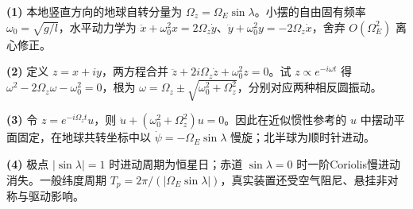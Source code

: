 \par\noindent\textbf{(1)} 本地竖直方向的地球自转分量为 \(\Omega_z=\Omega_E\sin\lambda\)。小摆的自由固有频率 \(\omega_0=\sqrt{g/l}\)，水平动力学为 \(\ddot x+\omega_0^2x=2\Omega_z\dot y\)、\(\ddot y+\omega_0^2y=-2\Omega_z\dot x\)，舍弃 \(O(\Omega_E^2)\) 离心修正。
\par\noindent\textbf{(2)} 定义 \(z=x+iy\)，两方程合并 \(\ddot z+2i\Omega_z\dot z+\omega_0^2z=0\)。试 \(z\propto e^{-i\omega t}\) 得 \(\omega^2-2\Omega_z\omega-\omega_0^2=0\)，根为 \(\omega=\Omega_z\pm\sqrt{\omega_0^2+\Omega_z^2}\)，分别对应两种相反圆振动。
\par\noindent\textbf{(3)} 令 \(z=e^{-i\Omega_z t}u\)，则 \(\ddot u+(\omega_0^2+\Omega_z^2)u=0\)。因此在近似惯性参考的 \(u\) 中摆动平面固定，在地球共转坐标中以 \(\dot\psi=-\Omega_E\sin\lambda\) 慢旋；北半球为顺时针进动。
\par\noindent\textbf{(4)} 极点 \(|\sin\lambda|=1\) 时进动周期为恒星日；赤道 \(\sin\lambda=0\) 时一阶Coriolis慢进动消失。一般纬度周期 \(T_p=2\pi/(|\Omega_E\sin\lambda|)\)，真实装置还受空气阻尼、悬挂非对称与驱动影响。
